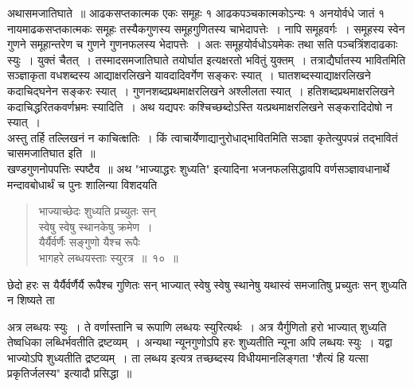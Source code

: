 \documentclass[11pt, openany]{book}
\begin{document}
\vspace{-3mm}
 अथासमजातिघाते~॥ आढकसप्तकात्मक एकः समूहः १ आढकपञ्चकात्मकोऽन्यः १ अनयोर्वधे जातं १ नायमाढकसप्तकात्मकः समूहः तस्यैकगुणस्य समूहगुणितस्य चाभेदापत्तेः~। नापि समूहवर्गः~। समूहस्य स्वेन 
गुणने समूहान्तरेण च गुणने गुणनफलस्य भेदापत्तेः~। अतः समूहयोर्वधोऽयमेकः तथा सति पञ्चत्रिंशदाढकाः स्युः~। युक्तं चैतत्~। तस्मादसमजातिघाते 
तयोर्घात इत्यक्षरतो भवितुं युक्तम्~। तत्राद्यैर्घातस्य भावितमिति
सञ्ज्ञाकृता वधशब्दस्य आद्याक्षरलिखने यावदादिवर्गेण सङ्करः स्यात्~।
घातशब्दस्याद्याक्षरलिखने कदाचिद्घनेन सङ्करः स्यात्~। गुणनशब्दप्रथमाक्षरलिखने अश्लीलता स्यात्~। हतिशब्दप्रथमाक्षरलिखने कदाचिद्धरितकवर्णभ्रमः स्यादिति~। अथ 
यद्यपरः कश्चिच्छब्दोऽस्ति यत्प्रथमाक्षरलिखने सङ्करादिदोषो न स्यात्~। \\

\vspace{-3mm}
 अस्तु तर्हि तल्लिखनं न काचित्क्षतिः~। किं त्वाचार्येणाद्यानुरोधाद्भावितमिति सञ्ज्ञा कृतेत्युपपन्नं तद्भावितं चासमजातिघात इति~॥ \\

\vspace{-3mm}
 खण्डगुणनोपपत्तिः स्पष्टैव~॥ अथ {\qt "भाज्याद्धरः शुध्यति"} इत्यादिना 
भजनफलसिद्धावपि वर्णसञ्ज्ञावधानार्थे मन्दावबोधार्थं च पुनः शालिन्या 
विशदयति\textendash 

 \label{10}
\begin{quote}
    \bs
     भाज्याच्छेदः शुध्यति प्रच्युतः सन् \\

\vspace{-7mm}
\hspace{1cm} स्वेषु स्वेषु स्थानकेषु क्रमेण~। \\

 \vspace{-7mm}
 यैर्यैर्वर्णैः सङ्गुणो यैश्च रूपैः \\

\vspace{-7mm}
\hspace{1cm} भागहरे लब्धयस्ताः स्युरत्र~॥~१०~॥
\end{quote}

 छेदो हरः स यैर्यैर्वर्णैर्यै रूपैश्च गुणितः सन् भाज्यात् स्वेषु स्वेषु
स्थानेषु यथास्वं समजातिषु प्रच्युतः सन् शुध्यति न शिष्यते ता
\newpage

\noindent अत्र लब्धयः स्युः~। ते वर्णास्तानि च रूपाणि लब्धयः स्युरित्यर्थः~। अत्र यैर्गुणितो हरो भाज्यात् शुध्यति तेष्वधिका लब्धिर्भवतीति द्रष्टव्यम्~। 
अन्यथा न्यूनगुणोऽपि हरः शुध्यतीति न्यूना अपि लब्धयः स्युः~। यद्वा 
भाज्योऽपि शुध्यतीति द्रष्टव्यम्~। ता लब्धय इत्यत्र तच्छब्दस्य विधीयमानलिङ्गता {\qt "शैत्यं हि यत्सा प्रकृतिर्जलस्य"} इत्यादौ प्रसिद्धा~॥ \\
\end{document}
